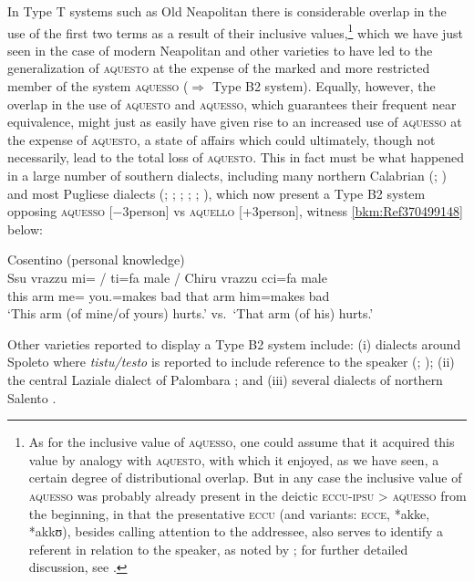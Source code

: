 \documentclass[output=paper]{langsci/langscibook}
\begin{document}
In Type T systems such as Old Neapolitan there is considerable overlap
in the use of the first two terms as a result of their inclusive
values,\footnote{As for the inclusive value of \textsc{aquesso}, one could
assume that it acquired this value by analogy with \textsc{aquesto}, with which
it enjoyed, as we have seen, a certain degree of distributional overlap. But in
any case the inclusive value of \textsc{aquesso} was probably already present
in the deictic \textsc{eccu-ipsu} > \textsc{aquesso} from the beginning, in
that the presentative \textsc{eccu} (and variants: \textsc{ecce}, *akke,
*akkʊ), besides calling attention to the addressee, also serves to identify a
referent in relation to the speaker, as noted by \citet[279]{Anderson:1985a};
for further detailed discussion, see \citet[78--87]{ledgeway2004sviluppo}.}
which we have just seen in the case of modern Neapolitan and other varieties to
have led to the generalization of \textsc{aquesto} at the expense of the marked
and more restricted member of the system \textsc{aquesso} (${\Rightarrow}$ Type
B2 system). Equally, however, the overlap in the use of \textsc{aquesto}
and \textsc{aquesso}, which guarantees their frequent near equivalence, might
just as easily have given rise to an increased use of \textsc{aquesso} at the
expense of \textsc{aquesto}, a state of affairs which could ultimately, though
not necessarily, lead to the total loss of \textsc{aquesto}. This in fact must
be what happened in a large number of southern dialects, including many
northern Calabrian (\citealt[167]{Rohlfs:1977a};
\citealt[104--107]{ledgeway2004sviluppo}) and most Pugliese dialects
(\citealt[207]{Rohlfs:1968a}; \citealt[27]{Valente:1975a};
\citealt[248]{Loporcaro:1988a}; \citealt[344]{Loporcaro:1997a};
\citealt[129f]{Loporcaro:2009a}; \citealt[107f]{ledgeway2004sviluppo}), which
now present a Type B2 system opposing \textsc{aquesso}
[−3person] vs \textsc{aquello} [+3person], witness \eqref{bkm:Ref370499148} below:

\ea\label{bkm:Ref370499148} Cosentino (personal knowledge)\\
    \ea
    \gll Ssu  vrazzu  mi= / ti=fa  male \textup{\quad /\quad}  Chiru  vrazzu cci=fa  male\\
        this  arm  me= {} you.\Sg{}=makes  bad {} that  arm  him=makes bad\\
    \glt \enquote*{This arm (of mine/of yours) hurts.} vs.\ \enquote*{That arm
        (of his) hurts.}
    \z
\z

Other  varieties reported to display a Type B2 system
include: (i) dialects around Spoleto where \emph{tistu/testo} is reported to
include reference to the speaker (\citealt[98]{Moretti:1987a};
\citealt[171]{Stavinschi:2009a}); (ii) the central Laziale dialect of Palombara
\citep[140]{Stavinschi:2009a}; and (iii) several dialects of northern Salento
\citep[157, 159]{Mancarella:1998a}.
\end{document}
